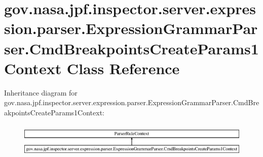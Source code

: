 \hypertarget{classgov_1_1nasa_1_1jpf_1_1inspector_1_1server_1_1expression_1_1parser_1_1_expression_grammar_pa96543943a9acc7eb3cd37320a4fc3ee4}{}\section{gov.\+nasa.\+jpf.\+inspector.\+server.\+expression.\+parser.\+Expression\+Grammar\+Parser.\+Cmd\+Breakpoints\+Create\+Params1\+Context Class Reference}
\label{classgov_1_1nasa_1_1jpf_1_1inspector_1_1server_1_1expression_1_1parser_1_1_expression_grammar_pa96543943a9acc7eb3cd37320a4fc3ee4}
Inheritance diagram for gov.\+nasa.\+jpf.\+inspector.\+server.\+expression.\+parser.\+Expression\+Grammar\+Parser.\+Cmd\+Breakpoints\+Create\+Params1\+Context\+:\begin{figure}[H]
\begin{center}
\leavevmode
\includegraphics[height=1.666667cm]{classgov_1_1nasa_1_1jpf_1_1inspector_1_1server_1_1expression_1_1parser_1_1_expression_grammar_pa96543943a9acc7eb3cd37320a4fc3ee4}
\end{center}
\end{figure}
